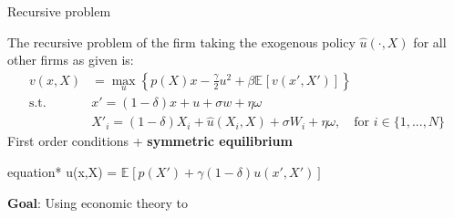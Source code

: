 \documentclass[aspectratio=169,10pt]{beamer}
\newcommand{\emphcolor}[1]{\textbf{\textcolor{emphcolorval}{#1}}}
\newcommand{\expec}[2][]{\ensuremath{\mathbb{E}_{{#1}}\left[ {#2} \right]}}
\begin{document}
\begin{frame}{Recursive problem}
	
	
	The recursive problem of the firm taking the exogenous policy $\hat{u}(\cdot, X)$ for all other firms as given is:
	\begin{align*}
		v(x,X)       & =\max_{u}\left\{p(X)x -  \frac{\gamma}{2} u^2 + \beta \expec{v(x',X')}\right\}                      \\
		\text{s.t. } & x' = (1-\delta)x + u + \sigma w + \eta \omega                                                       \\
		& X'_i = (1-\delta)X_i + \hat{u}(X_i,X) + \sigma W_i + \eta \omega,\quad\text{for } i \in \{1,...,N\}\end{align*}
	First order conditions + \emphcolor{symmetric equilibrium}
	\begin{empheq}[box=\tcbhighmath]{equation*}
		\gamma u(x,X) = \beta \expec{p(X')+\gamma (1-\delta) u(x',X') }
	\end{empheq}
	\emphcolor{Goal}: Using economic theory to
	

\end{frame}
\end{document}
